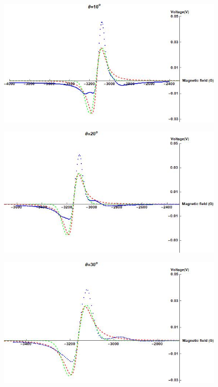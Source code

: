 \documentclass[openany,11pt,a4paper]{report}
\begin{document}
\begin{figure}[H]
\centering
\includegraphics[scale=0.6]{10.jpg}
\end{figure}




\begin{figure}[H]
\centering
\includegraphics[scale=0.6]{20.jpg}
\end{figure}




\begin{figure}[H]
\centering
\includegraphics[scale=0.6]{30.jpg}
\end{figure}
\end{document}
